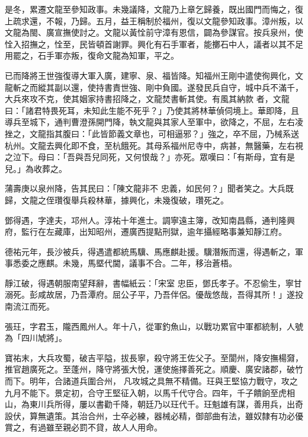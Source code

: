 \begin{pinyinscope}
 是冬，累遷文龍至參知政事。未幾議降，文龍乃上章乞歸養，既出國門而悔之，復上疏求還，不報，乃歸。五月，益王稱制於福州，復以文龍參知政事。漳州叛，以
 文龍為閩、廣宣撫使討之。文龍以黃恮前守漳有恩信，闢為參謀官。按兵泉州，使恮入招撫之，恮至，民皆頓首謝罪。興化有石手軍者，能擲石中人，議者以其不足用罷之，石手軍亦叛，復命文龍為知軍，平之。



 已而降將王世強復導大軍入廣，建寧、泉、福皆降。知福州王剛中遣使徇興化，文龍斬之而縱其副以還，使持書責世強、剛中負國。遂發民兵自守，城中兵不滿千，大兵來攻不克，使其姻家持書招降之，文龍焚書斬其使。有風其納款
 者，文龍曰：「諸君特畏死耳，未知此生能不死乎？」乃使其將林華偵伺境上。華即降，且導兵至城下，通判曹澄孫開門降，執文龍與其家人至軍中，欲降之，不屈，左右凌挫之，文龍指其腹曰：「此皆節義文章也，可相逼邪？」強之，卒不屈，乃械系送杭州。文龍去興化即不食，至杭餓死。其母系福州尼寺中，病甚，無醫藥，左右視之泣下。母曰：「吾與吾兒同死，又何恨哉？」亦死。眾嘆曰：「有斯母，宜有是兒。」為收葬之。



 蒲壽庚以泉州降，告其民曰：「陳文龍非不
 忠義，如民何？」聞者笑之。大兵既歸，文龍之侄瓚復舉兵殺林華，據興化，未幾復破，瓚死之。



 鄧得遇，字達夫，邛州人。淳祐十年進士。調寧遠主簿，改知南昌縣，通判隆興府，監行在左藏庫，出知昭州，遷廣西提點刑獄，逾年攝經略事兼知靜江府。



 德祐元年，長沙被兵，得遇遣都統馬驥、馬應麒赴援。驥潛叛而還，得遇斬之，軍事悉委之應麒。未幾，馬塈代閫，議事不合。二年，移治蒼梧。



 靜江破，得遇朝服南望拜辭，書幅紙云：「宋室
 忠臣，鄧氏孝子。不忍偷生，寧甘溺死。彭咸故居，乃吾潭府。屈公子平，乃吾伴侶。優哉悠哉，吾得其所！」遂投南流江而死。



 張玨，字君玉，隴西鳳州人。年十八，從軍釣魚山，以戰功累官中軍都統制，人號為「四川虓將」。



 寶祐末，大兵攻蜀，破吉平隘，拔長寧，殺守將王佐父子。至閬州，降安撫楊奫，推官趙廣死之。至蓬州，降守將張大悅，運使施擇善死之。順慶、廣安諸郡，破竹而下。明年，合諸道兵圍合州，
 凡攻城之具無不精備。玨與王堅協力戰守，攻之九月不能下。景定初，合守王堅征入朝，以馬千代守合。四年，千子饋餉至虎相山，為東川兵所得，屢以書勸千降，朝廷乃以玨代千。玨魁雄有謀，善用兵，出奇設伏，算無遺策。其治合州，士卒必練，器械必精，御部曲有法，雖奴隸有功必優賞之，有過雖至親必罰不貸，故人人用命。




\end{pinyinscope}
